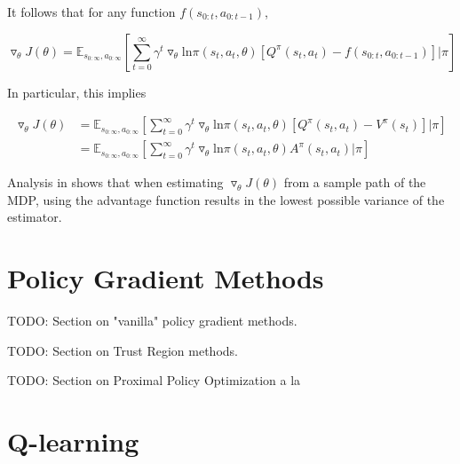 \documentclass[11pt]{article}
\theoremstyle{definition}
\begin{document}
It follows that for any function $f(s_{0:t},a_{0:t-1})$,

\begin{equation}
\triangledown_{\theta}J(\theta) = \mathbb{E}_{s_{0:\infty},a_{0:\infty}} \left[ \sum_{t=0}^{\infty} \gamma^t \triangledown_{\theta} \mathrm{ln}\pi(s_t,a_t,\theta) \left[ Q^{\pi} (s_t,a_t) - f(s_{0:t},a_{0:t-1}) \right] | \pi \right]
\end{equation}

In particular, this implies

\begin{equation}
\begin{split}
\triangledown_{\theta}J(\theta) &= \mathbb{E}_{s_{0:\infty},a_{0:\infty}} \left[ \sum_{t=0}^{\infty} \gamma^t \triangledown_{\theta} \mathrm{ln}\pi(s_t,a_t,\theta) \left[ Q^{\pi} (s_t,a_t) - V^{\pi}(s_t) \right] | \pi \right] \\
&= \mathbb{E}_{s_{0:\infty},a_{0:\infty}} \left[ \sum_{t=0}^{\infty} \gamma^t \triangledown_{\theta} \mathrm{ln}\pi(s_t,a_t,\theta) A^{\pi} (s_t,a_t) | \pi \right]
\end{split}
\end{equation}

Analysis in \cite{greensmith2004} shows that when estimating $\triangledown_{\theta}J(\theta)$ from a sample path of the MDP, using the advantage function results in the lowest possible variance of the estimator.

\section{Policy Gradient Methods}

TODO: Section on "vanilla" policy gradient methods.  
  
TODO: Section on Trust Region methods.  
  
TODO: Section on Proximal Policy Optimization a la \cite{schulmanppo}

\section{Q-learning}
\end{document}
